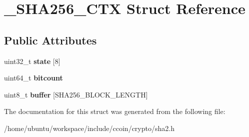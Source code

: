 \hypertarget{struct__SHA256__CTX}{\section{\-\_\-\-S\-H\-A256\-\_\-\-C\-T\-X Struct Reference}
\label{struct__SHA256__CTX}
}
\subsection*{Public Attributes}
\begin{DoxyCompactItemize}
\item 
\hypertarget{struct__SHA256__CTX_abd2d6cafcfc3bac16b0ed3004398441f}{uint32\-\_\-t {\bfseries state} \mbox{[}8\mbox{]}}\label{struct__SHA256__CTX_abd2d6cafcfc3bac16b0ed3004398441f}

\item 
\hypertarget{struct__SHA256__CTX_a8c4fdecd6c096b7d1627720622d39a3d}{uint64\-\_\-t {\bfseries bitcount}}\label{struct__SHA256__CTX_a8c4fdecd6c096b7d1627720622d39a3d}

\item 
\hypertarget{struct__SHA256__CTX_a3961040fe6b7982171684f77a7577572}{uint8\-\_\-t {\bfseries buffer} \mbox{[}S\-H\-A256\-\_\-\-B\-L\-O\-C\-K\-\_\-\-L\-E\-N\-G\-T\-H\mbox{]}}\label{struct__SHA256__CTX_a3961040fe6b7982171684f77a7577572}

\end{DoxyCompactItemize}


The documentation for this struct was generated from the following file\-:\begin{DoxyCompactItemize}
\item 
/home/ubuntu/workspace/include/ccoin/crypto/sha2.\-h\end{DoxyCompactItemize}
